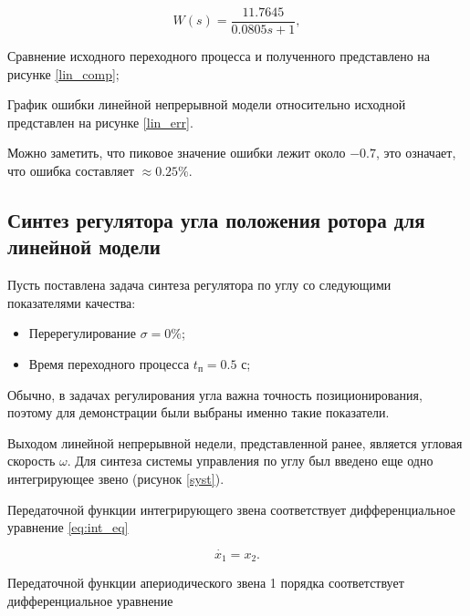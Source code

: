\begin{equation}
  W(s)=\frac{11.7645}{0.0805s+1},
  \label{eq:lin_dbm}
\end{equation}

Сравнение исходного переходного процесса и полученного представлено на рисунке \ref{lin_comp};

\clearpage


График ошибки линейной непрерывной модели относительно исходной представлен на рисунке \ref{lin_err}.


Можно заметить, что пиковое значение ошибки лежит около $-0.7$, это означает, что ошибка составляет
$\approx0.25\%$.

\subsection{Синтез регулятора угла положения ротора для линейной модели}

Пусть поставлена задача синтеза регулятора по углу со следующими показателями качества:

\begin{itemize}
  \item Перерегулирование $\sigma = 0\%$;
  \item Время переходного процесса $t_{\text{п}}=0.5$ с;
\end{itemize}

Обычно, в задачах регулирования угла важна точность позиционирования, поэтому для демонстрации
были выбраны именно такие показатели.

Выходом линейной непрерывной недели, представленной ранее, является угловая скорость $\omega$.
Для синтеза системы управления по углу был введено еще одно интегрирующее 
звено (рисунок \ref{syst}).


Передаточной функции интегрирующего звена соответствует дифференциальное уравнение \ref{eq:int_eq}

\begin{equation}
  \dot{x_1}=x_2.
  \label{eq:int_eq}
\end{equation}

Передаточной функции апериодического звена 1 порядка соответствует дифференциальное уравнение

